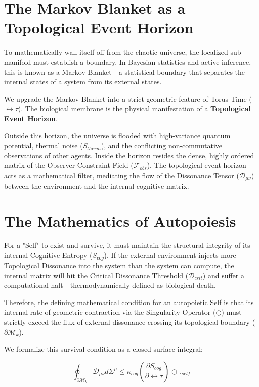 \documentclass[12pt,openany]{book}
\begin{document}
\section{The Markov Blanket as a Topological Event Horizon}
To mathematically wall itself off from the chaotic universe, the localized sub-manifold must establish a boundary. In Bayesian statistics and active inference, this is known as a Markov Blanket---a statistical boundary that separates the internal states of a system from its external states.

We upgrade the Markov Blanket into a strict geometric feature of Torus-Time ($\leftrightarrow\tau$). The biological membrane is the physical manifestation of a \textbf{Topological Event Horizon}. 

Outside this horizon, the universe is flooded with high-variance quantum potential, thermal noise ($S_{therm}$), and the conflicting non-commutative observations of other agents. Inside the horizon resides the dense, highly ordered matrix of the Observer Constraint Field ($\mathcal{F}_{obs}$). The topological event horizon acts as a mathematical filter, mediating the flow of the Dissonance Tensor ($\mathcal{D}_{\mu\nu}$) between the environment and the internal cognitive matrix.

\section{The Mathematics of Autopoiesis}
For a "Self" to exist and survive, it must maintain the structural integrity of its internal Cognitive Entropy ($S_{cog}$). If the external environment injects more Topological Dissonance into the system than the system can compute, the internal matrix will hit the Critical Dissonance Threshold ($\mathcal{D}_{crit}$) and suffer a computational halt---thermodynamically defined as biological death.

Therefore, the defining mathematical condition for an autopoietic Self is that its internal rate of geometric contraction via the Singularity Operator ($\bigcirc$) must strictly exceed the flux of external dissonance crossing its topological boundary ($\partial \mathcal{M}_k$). 

We formalize this survival condition as a closed surface integral:

\begin{equation}
\oint_{\partial \mathcal{M}_k} \mathcal{D}_{\mu\nu} d\Sigma^\mu \le \kappa_{cog} \left( \frac{\partial S_{cog}}{\partial \leftrightarrow\tau} \right) \bigcirc \mathbb{I}_{self} 
\end{equation}
\end{document}
